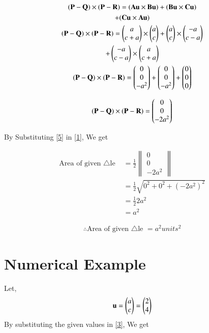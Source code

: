 \documentclass[journal,12pt,twocolumn]{IEEEtran}
\renewcommand\thesection{\arabic{section}}
\begin{document}
\begin{enumerate}[label=\thesection.\arabic*.,ref=\thesection.\theenumi]
\begin{multline}
(\Vec{P-Q})\times(\Vec{P-R})=(\vec{Au}\times\vec{Bu})+(\vec{Bu}\times\vec{Cu})\\+(\vec{Cu}\times\vec{Au})\\
(\Vec{P-Q})\times(\Vec{P-R})=\myvec{a\\c+a}\times\myvec{a\\c}+\myvec{a\\c}\times\myvec{-a\\c-a}\\+\myvec{-a\\c-a}\times\myvec{a\\c+a}\\
(\Vec{P-Q})\times(\Vec{P-R})=\myvec{0\\0\\-a^2}+\myvec{0\\0\\-a^2}+\myvec{0\\0\\0}
\end{multline}

\begin{align}
(\Vec{P-Q})\times(\Vec{P-R})=\myvec{0\\0\\-2a^2}
\label{5}
\end{align}

By Substituting \eqref{5} in \eqref{1}, We get

\begin{align}
\text{Area of given $\triangle$le }&=\frac{1}{2}\begin{Vmatrix}
0\\0\\-2a^2
\end{Vmatrix}\\
&= \frac{1}{2}\sqrt{0^2 + 0^2+ (-2a^2)^2}\\
&= \frac{1}{2} 2a^2\\
&=a^2
\end{align}

\begin{align}
\boxed{\therefore \text{Area of given $\triangle$le }=a^2 units^2}
\label{4}
\end{align}

\section{Numerical Example}
Let,
\begin{align}
\mathbf{u}=\begin{pmatrix}a\\c\end{pmatrix}=\begin{pmatrix}2\\4\end{pmatrix}
\end{align}
\solution
By substituting the given values in \eqref{3}, We get


\end{enumerate}
\end{document}
